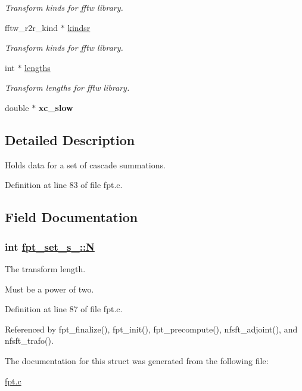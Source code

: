 \begin{CompactItemize}
\begin{CompactList}\small\item\em Transform kinds for fftw library. \item\end{CompactList}\item 
\hypertarget{structfpt__set__s___o16}{
fftw\_\-r2r\_\-kind $\ast$ \hyperlink{structfpt__set__s___o16}{kindsr}}
\label{structfpt__set__s___o16}

\begin{CompactList}\small\item\em Transform kinds for fftw library. \item\end{CompactList}\item 
\hypertarget{structfpt__set__s___o17}{
int $\ast$ \hyperlink{structfpt__set__s___o17}{lengths}}
\label{structfpt__set__s___o17}

\begin{CompactList}\small\item\em Transform lengths for fftw library. \item\end{CompactList}\item 
\hypertarget{structfpt__set__s___o18}{
double $\ast$ {\bf xc\_\-slow}}
\label{structfpt__set__s___o18}

\end{CompactItemize}


\subsection{Detailed Description}
Holds data for a set of cascade summations. 



Definition at line 83 of file fpt.c.

\subsection{Field Documentation}
\hypertarget{structfpt__set__s___o2}{
\subsubsection[N]{\setlength{\rightskip}{0pt plus 5cm}int \hyperlink{structfpt__set__s___o2}{fpt\_\-set\_\-s\_\-::N}}}
\label{structfpt__set__s___o2}


The transform length. 

Must be a power of two. 

Definition at line 87 of file fpt.c.

Referenced by fpt\_\-finalize(), fpt\_\-init(), fpt\_\-precompute(), nfsft\_\-adjoint(), and nfsft\_\-trafo().

The documentation for this struct was generated from the following file:\begin{CompactItemize}
\item 
\hyperlink{fpt_8c}{fpt.c}\end{CompactItemize}
